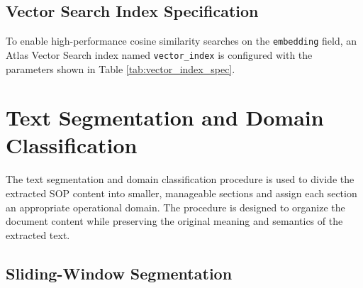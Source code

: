 \subsection{Vector Search Index Specification}
To enable high-performance cosine similarity searches on the \texttt{embedding} field, an Atlas Vector Search index named \texttt{vector\_index} is configured with the parameters shown in Table \ref{tab:vector_index_spec}.

\begin{table}[H]
\centering
\caption{Vector Search Index Configuration}
\label{tab:vector_index_spec}
\end{table}

\section{Text Segmentation and Domain Classification}
\label{sec:design_algorithms}

The text segmentation and domain classification procedure is used to divide the extracted SOP content into smaller, manageable sections and assign each section an appropriate operational domain. The procedure is designed to organize the document content while preserving the original meaning and semantics of the extracted text.

\subsection{Sliding-Window Segmentation}

